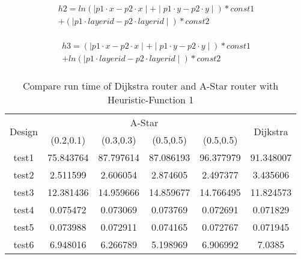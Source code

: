 \documentclass[conference]{IEEEtran}
\begin{document}
\begin{multline*}
h2=ln(\mid p1\cdot x-p2\cdot x\mid+\mid p1\cdot y-p2\cdot y\mid)*const1\\
+(\mid p1\cdot layerid-p2\cdot layerid\mid)*const2\\
\end{multline*}

\begin{multline*}
h3=(\mid p1\cdot x-p2\cdot x\mid+\mid p1\cdot y-p2\cdot y\mid)*const1\\
+ln(\mid p1\cdot layerid-p2\cdot layerid\mid)*const2\\
\end{multline*}


{\tiny{}}
\begin{table}[b]
{\tiny{}\caption{\label{tab:Compare-run-time}Compare run time of Dijkstra router and
A-Star router with Heuristic-Function 1}
}{\tiny\par}
\centering{}{\footnotesize{}}%
\begin{adjustbox}{width=\columnwidth,center}
\begin{tabular}{|c|c|c|c|c|c|}
\hline 
\multirow{2}{*}{{\footnotesize{}Design}} & \multicolumn{4}{c|}{{\footnotesize{}A-Star}} & \multirow{2}{*}{{\footnotesize{}Dijkstra}}\tabularnewline
\cline{2-5} \cline{3-5} \cline{4-5} \cline{5-5} 
 & {\footnotesize{}(0.2,0.1)} & {\footnotesize{}(0.3,0.3)} & {\footnotesize{}(0.5,0.5)} & \multicolumn{1}{c||}{{\footnotesize{}(0.5,0.5)}} & \tabularnewline
\hline 
\hline 
{\footnotesize{}test1} & {\footnotesize{}75.843764} & {\footnotesize{}87.797614} & {\footnotesize{}87.086193} & {\footnotesize{}96.377979} & {\footnotesize{}91.348007}\tabularnewline
\hline 
{\footnotesize{}test2} & {\footnotesize{}2.511599} & {\footnotesize{}2.606054} & {\footnotesize{}2.874605} & {\footnotesize{}2.497377} & {\footnotesize{}3.435606}\tabularnewline
\hline 
{\footnotesize{}test3} & {\footnotesize{}12.381436} & {\footnotesize{}14.959666} & {\footnotesize{}14.859677} & {\footnotesize{}14.766495} & {\footnotesize{}11.824573}\tabularnewline
\hline 
{\footnotesize{}test4} & {\footnotesize{}0.075472} & {\footnotesize{}0.073069} & {\footnotesize{}0.073769} & {\footnotesize{}0.072691} & {\footnotesize{}0.071829}\tabularnewline
\hline 
{\footnotesize{}test5} & {\footnotesize{}0.073988} & {\footnotesize{}0.072911} & {\footnotesize{}0.074165} & {\footnotesize{}0.072767} & {\footnotesize{}0.071945}\tabularnewline
\hline 
{\footnotesize{}test6} & {\footnotesize{}6.948016} & {\footnotesize{}6.266789} & {\footnotesize{}5.198969} & {\footnotesize{}6.906992} & {\footnotesize{}7.0385}\tabularnewline
\hline 
\end{tabular}{\footnotesize\par}
\end{adjustbox}
\end{table}
{\tiny\par}
\end{document}
